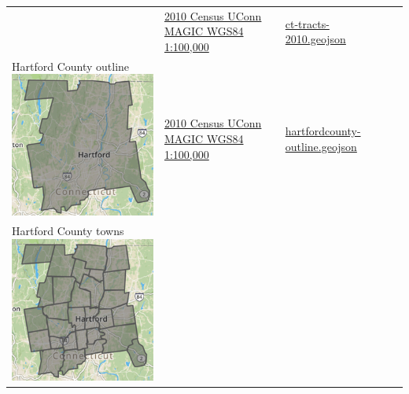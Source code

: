 \documentclass[
  english,
]{book}
\begin{document}
\begin{longtable}[]{@{}llll@{}}
\begin{minipage}[t]{0.28\columnwidth}
\end{minipage} & \begin{minipage}[t]{0.22\columnwidth}\raggedright
\href{http://magic.lib.uconn.edu/connecticut_data.html\#boundaries}{2010 Census UConn MAGIC WGS84 1:100,000}\strut
\end{minipage} & \begin{minipage}[t]{0.19\columnwidth}\raggedright
\href{data/ct-tracts-2010.geojson}{ct-tracts-2010.geojson}\strut
\end{minipage} & \begin{minipage}[t]{0.19\columnwidth}\raggedright
\strut
\end{minipage}\tabularnewline
\begin{minipage}[t]{0.28\columnwidth}\raggedright
Hartford County outline \includegraphics{data/hartfordcounty-outline.png}\strut
\end{minipage} & \begin{minipage}[t]{0.22\columnwidth}\raggedright
\href{http://magic.lib.uconn.edu/connecticut_data.html\#boundaries}{2010 Census UConn MAGIC WGS84 1:100,000}\strut
\end{minipage} & \begin{minipage}[t]{0.19\columnwidth}\raggedright
\href{data/hartfordcounty-outline.geojson}{hartfordcounty-outline.geojson}\strut
\end{minipage} & \begin{minipage}[t]{0.19\columnwidth}\raggedright
\strut
\end{minipage}\tabularnewline
\begin{minipage}[t]{0.28\columnwidth}\raggedright
Hartford County towns \includegraphics{data/hartfordcounty-towns.png}\strut

\end{minipage}
\end{longtable}
\end{document}
